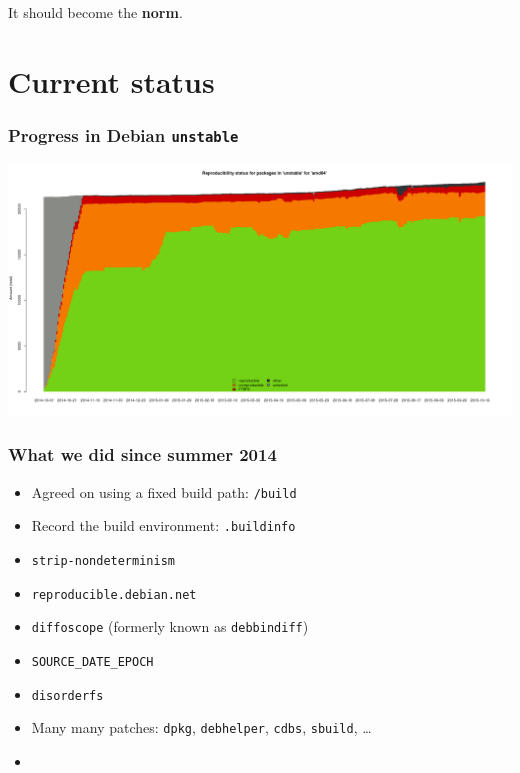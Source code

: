 \documentclass[14pt]{beamer}
\begin{document}
\begin{frame}[plain]
\begin{center}
 \Huge It should become the \textbf{norm}.\\
\end{center}

\end{frame}

\section{Current status}

\begin{frame}[plain]
 \frametitle{Progress in Debian \texttt{unstable}}
 \begin{center}
  \includegraphics[width=\paperwidth]{images/stats_pkg_state.png}
 \end{center}
\end{frame}

\begin{frame}
 \frametitle{What we did since summer 2014}

 \begin{itemize}
  \item Agreed on using a fixed build path: \texttt{/build}
  \item Record the build environment: \texttt{.buildinfo}
  \item \texttt{strip-nondeterminism}
  \item \texttt{reproducible.debian.net}
  \item \texttt{diffoscope} (formerly known as \texttt{debbindiff})
  \item \texttt{SOURCE\_DATE\_EPOCH}
  \item \texttt{disorderfs}
  \item Many many patches: \texttt{dpkg}, \texttt{debhelper}, \texttt{cdbs}, \texttt{sbuild}, …
  \item{}
 \end{itemize}
\end{frame}
\end{document}
